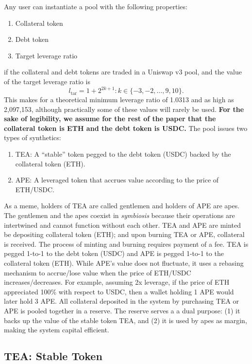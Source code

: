 \documentclass[journal,letterpaper,oneside,onecolumn,12pt]{IEEEtran}
\begin{document}
	Any user can instantiate a pool with the following properties:
	\begin{enumerate}
		\item Collateral token
		\item Debt token
		\item Target leverage ratio
	\end{enumerate}
	if the collateral and debt tokens are traded in a Uniswap v3 pool, and the value of the target leverage ratio is
	\begin{equation}
		l_\textrm{tar} = 1+2^{2k+1} : k\in\{-3,-2,\ldots,9,10\}.
	\end{equation}
	This makes for a theoretical minimum leverage ratio of 1.0313 and as high as 2,097,153, although practically some of these values will rarely be used.
	\textbf{For the sake of legibility, we assume for the rest of the paper that the collateral token is ETH and the debt token is USDC.}
	The pool issues two types of synthetics:
	\begin{enumerate}
		\item TEA: A ``stable'' token pegged to the debt token (USDC) backed by the collateral token (ETH).
		\item APE: A leveraged token that accrues value according to the price of ETH/USDC.
	\end{enumerate}
	As a meme, holders of TEA are called gentlemen and holders of APE are apes. The gentlemen and the apes coexist in \textit{symbiosis} because their operations are intertwined and cannot function without each other. TEA and APE are minted be depositing collateral token (ETH); and upon burning TEA or APE, collateral is received. The process of minting and burning requires payment of a fee.
	TEA is pegged 1-to-1 to the debt token (USDC) and APE is pegged 1-to-1 to the collateral token (ETH). While APE's value does not fluctuate, it uses a rebasing mechanism to accrue/lose value when the price of ETH/USDC increases/decreases. For example, assuming 2x leverage, if the price of ETH appreciated 100\% with respect to USDC, then a wallet holding 1 APE would later hold 3 APE.
	All collateral deposited in the system by purchasing TEA or APE is pooled together in a 
	reserve. 
	The reserve serves a a dual purpose: (1) it backs up the value of the stable token TEA, and (2) it is used by apes as margin, making the system capital efficient.

	



	\subsection{TEA: Stable Token}
\end{document}

